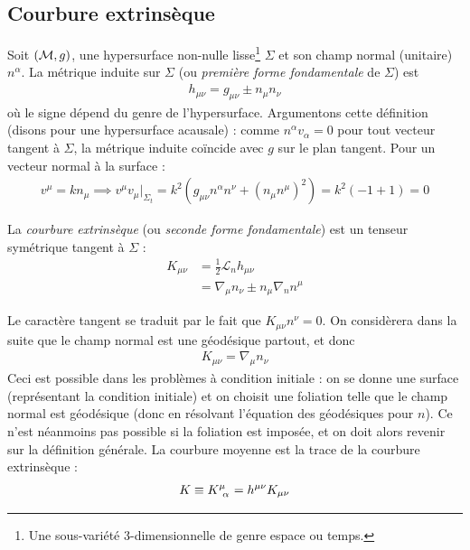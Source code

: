 \subsection{Courbure extrinsèque}
Soit $(\mathcal{M},g)$, une hypersurface non-nulle lisse\footnote{Une sous-variété 3-dimensionnelle de genre espace ou temps.} $\Sigma$ et son champ normal (unitaire) $n^\alpha$. La métrique induite sur $\Sigma$ (ou \emph{première forme fondamentale} de $\Sigma$) est
\begin{align}
    h_{\mu\nu} = g_{\mu\nu} \pm n_\mu n_\nu
\end{align}
où le signe dépend du genre de l'hypersurface. Argumentons cette définition (disons pour une hypersurface acausale) : comme $n^\alpha v_\alpha = 0$ pour tout vecteur tangent à $\Sigma$, la métrique induite coïncide avec $g$ sur le plan tangent. Pour un vecteur normal à la surface :
\begin{align}
    v^\mu = k n_\mu \implies v^\mu v_\mu |_{\Sigma_t}= k^2 ( g_{\mu\nu} n^\alpha n^\nu + (n_\mu n^\mu)^2) = k^2 (-1 +1) = 0 
\end{align}
\begin{theoremframe}
\begin{defi}
    La \emph{courbure extrinsèque} (ou \emph{seconde forme fondamentale}) est un tenseur symétrique tangent à $\Sigma$ :
    \begin{align}
        K_{\mu\nu} &= \frac{1}{2} \mathcal{L}_n h_{\mu \nu}\\
        &= \nabla_\mu n_\nu \pm n_\mu \nabla_n n^\mu
    \end{align}
\end{defi}
\end{theoremframe}
Le caractère tangent se traduit par le fait que $K_{\mu\nu} n^\nu = 0$. On considèrera dans la suite que le champ normal est une géodésique partout, et donc 
\begin{align}
    K_{\mu\nu} = \nabla_{\mu} n_\nu
\end{align}
Ceci est possible dans les problèmes à condition initiale : on se donne une surface (représentant la condition initiale) et on choisit une foliation telle que le champ normal est géodésique (donc en résolvant l'équation des géodésiques pour $n$). Ce n'est néanmoins pas possible si la foliation est imposée, et on doit alors revenir sur la définition générale. La courbure moyenne est la trace de la courbure extrinsèque :
\begin{align}
    K \equiv K\indices{^\mu_{\! \alpha}} = h^{\mu\nu} K_{\mu\nu}
\end{align}
